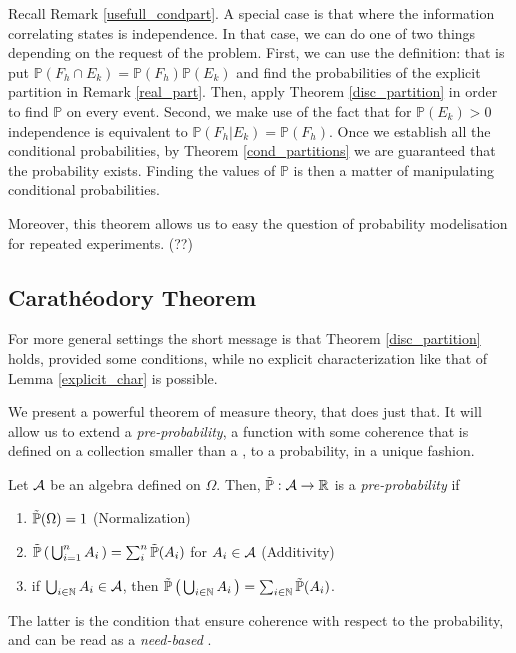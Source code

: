 \begin{my_remark}
	Recall Remark \ref{usefull_condpart}. A special case is that where the information correlating states is independence. In that case, we can do one of two things depending on the request of the problem. First, we can use the definition: that is put $\mathbb{P}(F_h \cap E_k)=\mathbb{P}(F_h)\mathbb{P}(E_k)$ and find the probabilities of the explicit partition in Remark \ref{real_part}. Then, apply Theorem \ref{disc_partition} in order to find $\mathbb{P}$ on every event. Second, we make use of the fact that for $\mathbb{P}(E_k)>0$ independence is equivalent to $\mathbb{P}(F_h|E_k)=\mathbb{P}(F_h)$. Once we establish all the conditional probabilities, by Theorem \ref{cond_partitions} we are guaranteed that the probability exists. Finding the values of $\mathbb{P}$ is then a matter of manipulating conditional probabilities.
\end{my_remark}
\begin{my_example}
	
\end{my_example}
Moreover, this theorem allows us to easy the question of probability modelisation for repeated experiments. (??)

\subsection{Carathéodory Theorem}

For more general settings the short message is that Theorem \ref{disc_partition} holds, provided some conditions, while no explicit characterization like that of Lemma \ref{explicit_char} is possible.

We present a powerful theorem of measure theory, that does just that. It will allow us to extend a \textit{pre-probability}, a function with some coherence that is defined on a collection smaller than a \sigmaalg , to a probability, in a unique fashion.

\goodbreak\begin{my_definition}
	\label{proprob}
	Let $\mathcal{A}$ be an algebra defined on $\Omega$. Then, $\tilde{\mathbb{P}}:\mathcal{A}\to\mathbb{R}$ is a \textit{pre-probability} if
	\begin{enumerate}
		\item $\tilde{\mathbb{P}}( \Omega ) = 1$ \hfill (Normalization)
		\item $\tilde{\mathbb{P}} \left( \, \bigcup^n_{i=1} A_i \, \right) = \sum^n_i \tilde{\mathbb{P}}(A_i)$ for $A_i\in\mathcal{A}$ \hfill (Additivity)
		\item if $\bigcup_{ i \in \mathbb{N} } A_i \in \mathcal{A}$, then $\tilde{\mathbb{P}} \left( \,\bigcup_{ i \in \mathbb{N} } A_i \,\right) = \sum_{ i \in \mathbb{N}} \tilde{\mathbb{P}}(A_i)$.
	\end{enumerate}
\end{my_definition}
\begin{my_remark}
	The latter is the condition that ensure coherence with respect to the probability, and can be read as a \textit{need-based \sigmaadd}.
\end{my_remark}

